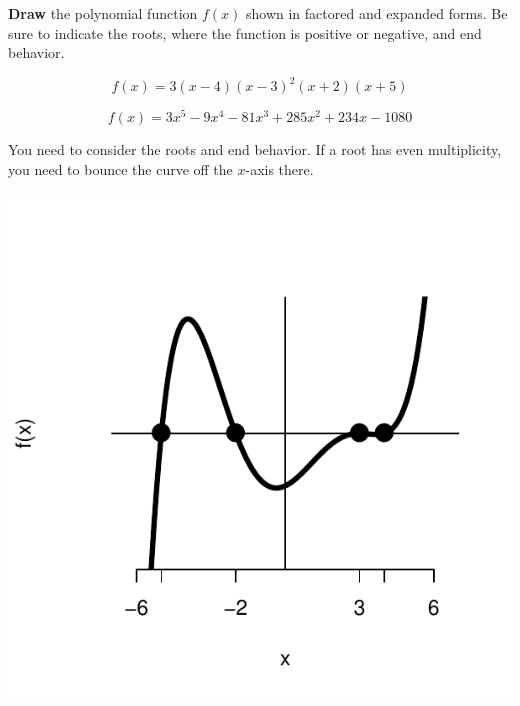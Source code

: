 
\begin{question}
\textbf{Draw} the polynomial function \(f(x)\) shown in factored and
expanded forms. Be sure to indicate the roots, where the function is
positive or negative, and end behavior.

\[f(x) = 3 \left(x - 4\right) \left(x - 3\right)^{2} \left(x + 2\right) \left(x + 5\right)\]

\[f(x) = 3 x^{5} - 9 x^{4} - 81 x^{3} + 285 x^{2} + 234 x - 1080 \]
\end{question}

\begin{solution}
You need to consider the roots and end behavior. If a root has even
multiplicity, you need to bounce the curve off the \(x\)-axis there.

\includegraphics{unnamed-chunk-2-1-2.pdf}\\
\end{solution}

